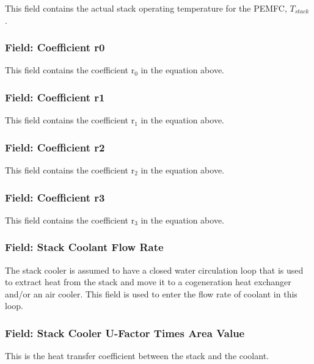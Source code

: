 This field contains the actual stack operating temperature for the PEMFC, \({T_{stack}}\) .

\subsubsection{Field: Coefficient r0}\label{field-coefficient-r0}

This field contains the coefficient r\(_{0}\) in the equation above.

\subsubsection{Field: Coefficient r1}\label{field-coefficient-r1}

This field contains the coefficient r\(_{1}\) in the equation above.

\subsubsection{Field: Coefficient r2}\label{field-coefficient-r2}

This field contains the coefficient r\(_{2}\) in the equation above.

\subsubsection{Field: Coefficient r3}\label{field-coefficient-r3}

This field contains the coefficient r\(_{3}\) in the equation above.

\subsubsection{Field: Stack Coolant Flow Rate}\label{field-stack-coolant-flow-rate}

The stack cooler is assumed to have a closed water circulation loop that is used to extract heat from the stack and move it to a cogeneration heat exchanger and/or an air cooler. This field is used to enter the flow rate of coolant in this loop.

\subsubsection{Field: Stack Cooler U-Factor Times Area Value}\label{field-stack-cooler-u-factor-times-area-value}

This is the heat transfer coefficient between the stack and the coolant.


